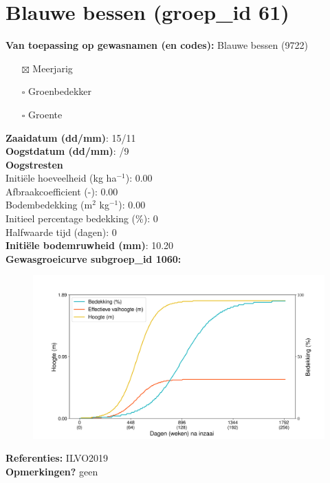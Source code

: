 \documentclass{article}
\begin{document}
 \section{Blauwe bessen (groep\_id 61)} 
 \textbf{Van toepassing op gewasnamen (en codes):} Blauwe bessen (9722) 
 \begin{multicols}{3} \begin{itemize} \item[$\boxtimes$] Meerjarig \item[$\square$] Groenbedekker \item[$\square$] Groente \end{itemize} \end{multicols} 
  \textbf{Zaaidatum (dd/mm)}: 15/11  \vspace{0.10cm} \\ 
  \textbf{Oogstdatum (dd/mm)}: /9  \vspace{0.10cm} \\ 
  \textbf{Oogstresten} \vspace{0.05cm} \\ 
  \tab Initi\"{e}le hoeveelheid (kg ha$^{-1}$): 0.00 \vspace{0.05cm} \\ 
  \tab Afbraakcoefficient (-): 0.00 \vspace{0.05cm} \\ 
  \tab Bodembedekking (m$^2$ kg$^{-1}$): 0.00 \vspace{0.05cm} \\ 
  \tab Initieel percentage bedekking (\%): 0 \vspace{0.05cm} \\ 
  \tab Halfwaarde tijd (dagen): 0 \vspace{0.05cm} \\ 
  \textbf{Initi\"{e}le bodemruwheid (mm)}: 10.20 \vspace{0.05cm} \\ 
  \textbf{Gewasgroeicurve subgroep\_id 1060:} 
 \begin{center} \begin{figure}[H] \includegraphics[width=12.5cm]{temp/1060.png} \end{figure} \end{center} 
  \textbf{Referenties:} ILVO2019 \vspace{0.10cm} \\ 
  \textbf{Opmerkingen?} geen \vspace{0.10cm} \\ 
 \newpage 
\end{document}
